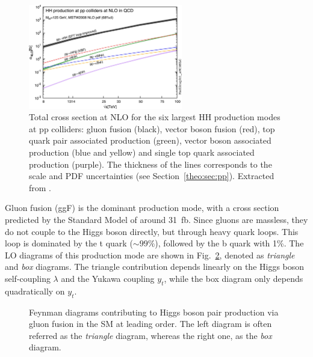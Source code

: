 \documentclass[../main.tex]{subfiles}
\begin{document}
\begin{figure}[h!]
\begin{center}
\includegraphics[width=0.6\textwidth]{Images/hh_production_xs}
\end{center}
\caption[Total cross section at NLO for the six largest HH production modes]{Total cross section at NLO for the six largest HH production modes at pp colliders: gluon fusion (black), vector boson fusion (red), top quark pair associated production (green), vector boson associated production (blue and yellow) and single top quark associated production (purple). The thickness of the lines corresponds to the scale and PDF uncertainties (see Section~\ref{theo:sec:pp}). Extracted from \cite{intro:theo:hh_prod_modes}.}
\label{theo:fig:hh_production_xs}
\end{figure}


Gluon fusion (ggF) is the dominant production mode, with a cross section predicted by the Standard Model of around 31~fb. Since gluons are massless, they do not couple to the Higgs boson directly, but through heavy quark loops. This loop is dominated by the t quark ($\sim99\%$), followed by the b quark with 1\%. The LO diagrams of this production mode are shown in Fig.~\ref{theo:fig:ggf_feynman}, denoted as \textit{triangle} and \textit{box} diagrams. The triangle contribution depends linearly on the Higgs boson self-coupling $\lambda$ and the Yukawa coupling $y_t$, while the box diagram only depends quadratically on $y_t$.


\begin{figure}[h!]
\begin{center}
\end{center}
\caption[HH gluon fusion Feynman diagrams]{Feynman diagrams contributing to Higgs boson pair production via gluon fusion in the SM at leading order. The left diagram is often referred as the \textit{triangle} diagram, whereas the right one, as the \textit{box} diagram.}
\label{theo:fig:ggf_feynman}
\end{figure}
\end{document}
